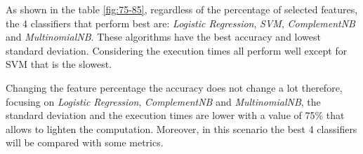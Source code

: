 \noindent
As shown in the table \ref{fig:75-85}, regardless of the percentage of selected features, the 4 classifiers that perform best are: \emph{Logistic Regression}, \emph{SVM}, \emph{ComplementNB} and \emph{MultinomialNB}. These algorithms have the best accuracy and lowest standard deviation. Considering the execution times all perform well except for SVM that is the slowest.

Changing the feature percentage the accuracy does not change a lot therefore, focusing on \emph{Logistic Regression}, \emph{ComplementNB} and \emph{MultinomialNB}, the standard deviation and the execution times are lower with a value of 75\% that allows to lighten the computation.
Moreover, in this scenario the best 4 classifiers will be compared with some metrics.